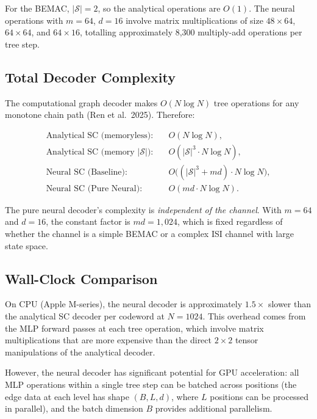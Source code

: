 \documentclass[11pt,a4paper]{article}
\begin{document}
For the BEMAC, $|\mathcal{S}| = 2$, so the analytical operations are $O(1)$. The neural operations with $m = 64$, $d = 16$ involve matrix multiplications of size $48 \times 64$, $64 \times 64$, and $64 \times 16$, totalling approximately 8,300 multiply-add operations per tree step.

\subsection{Total Decoder Complexity}

The computational graph decoder makes $O(N \log N)$ tree operations for any monotone chain path (Ren et al.\ 2025). Therefore:

\begin{align}
    \text{Analytical SC (memoryless):} &\quad O(N \log N), \\
    \text{Analytical SC (memory $|\mathcal{S}|$):} &\quad O(|\mathcal{S}|^3 \cdot N \log N), \\
    \text{Neural SC (Baseline):} &\quad O\bigl((|\mathcal{S}|^3 + md) \cdot N \log N\bigr), \\
    \text{Neural SC (Pure Neural):} &\quad O(md \cdot N \log N).
\end{align}

The pure neural decoder's complexity is \emph{independent of the channel}. With $m = 64$ and $d = 16$, the constant factor is $md = 1{,}024$, which is fixed regardless of whether the channel is a simple BEMAC or a complex ISI channel with large state space.

\subsection{Wall-Clock Comparison}

On CPU (Apple M-series), the neural decoder is approximately $1.5\times$ slower than the analytical SC decoder per codeword at $N = 1024$. This overhead comes from the MLP forward passes at each tree operation, which involve matrix multiplications that are more expensive than the direct $2 \times 2$ tensor manipulations of the analytical decoder.

However, the neural decoder has significant potential for GPU acceleration: all MLP operations within a single tree step can be batched across positions (the edge data at each level has shape $(B, L, d)$, where $L$ positions can be processed in parallel), and the batch dimension $B$ provides additional parallelism.

\end{document}

